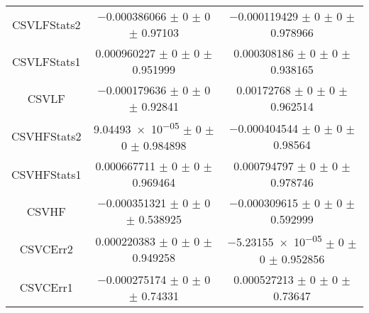 \begin{table}
\begin{tabular}{ccc}
CSVLFStats2 	& \num{-0.000386066} $\pm$ \num{0} $\pm$ \num{0} $\pm$ \num{0.97103} 	& \num{-0.000119429} $\pm$ \num{0} $\pm$ \num{0} $\pm$ \num{0.978966}\\
CSVLFStats1 	& \num{0.000960227} $\pm$ \num{0} $\pm$ \num{0} $\pm$ \num{0.951999} 	& \num{0.000308186} $\pm$ \num{0} $\pm$ \num{0} $\pm$ \num{0.938165}\\
CSVLF 	& \num{-0.000179636} $\pm$ \num{0} $\pm$ \num{0} $\pm$ \num{0.92841} 	& \num{0.00172768} $\pm$ \num{0} $\pm$ \num{0} $\pm$ \num{0.962514}\\
CSVHFStats2 	& \num{9.04493e-05} $\pm$ \num{0} $\pm$ \num{0} $\pm$ \num{0.984898} 	& \num{-0.000404544} $\pm$ \num{0} $\pm$ \num{0} $\pm$ \num{0.98564}\\
CSVHFStats1 	& \num{0.000667711} $\pm$ \num{0} $\pm$ \num{0} $\pm$ \num{0.969464} 	& \num{0.000794797} $\pm$ \num{0} $\pm$ \num{0} $\pm$ \num{0.978746}\\
CSVHF 	& \num{-0.000351321} $\pm$ \num{0} $\pm$ \num{0} $\pm$ \num{0.538925} 	& \num{-0.000309615} $\pm$ \num{0} $\pm$ \num{0} $\pm$ \num{0.592999}\\
CSVCErr2 	& \num{0.000220383} $\pm$ \num{0} $\pm$ \num{0} $\pm$ \num{0.949258} 	& \num{-5.23155e-05} $\pm$ \num{0} $\pm$ \num{0} $\pm$ \num{0.952856}\\
CSVCErr1 	& \num{-0.000275174} $\pm$ \num{0} $\pm$ \num{0} $\pm$ \num{0.74331} 	& \num{0.000527213} $\pm$ \num{0} $\pm$ \num{0} $\pm$ \num{0.73647}\\
\bottomrule
\end{tabular}
\end{table}